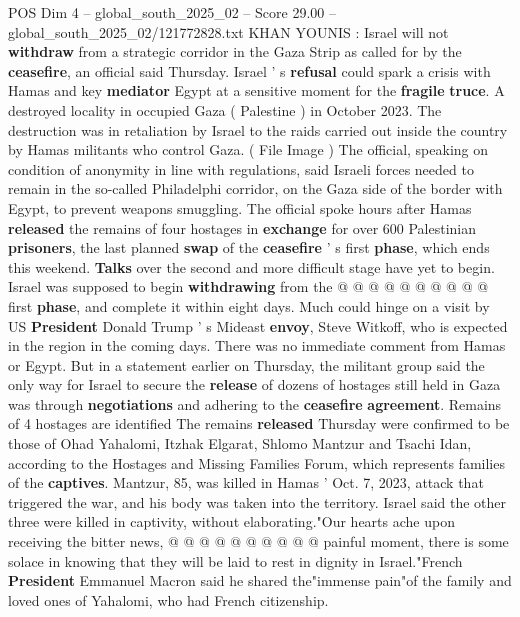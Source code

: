 \begin{textsample}{POS Dim 4 – global\_south\_2025\_02 – Score 29.00 – global\_south\_2025\_02/121772828.txt}  \label{ex:f4_pos_025}
KHAN YOUNIS : Israel will not \textbf{withdraw} from a strategic corridor in the Gaza Strip as called for by the \textbf{ceasefire}, an official said Thursday.
Israel ' s \textbf{refusal} could spark a crisis with Hamas and key \textbf{mediator} Egypt at a sensitive moment for the \textbf{fragile} \textbf{truce}.
A destroyed locality in occupied Gaza ( Palestine ) in October 2023.
The destruction was in retaliation by Israel to the raids carried out inside the country by Hamas militants who control Gaza. ( File Image ) The official, speaking on condition of anonymity in line with regulations, said Israeli forces needed to remain in the so-called Philadelphi corridor, on the Gaza side of the border with Egypt, to prevent weapons smuggling.
The official spoke hours after Hamas \textbf{released} the remains of four hostages in \textbf{exchange} for over 600 Palestinian \textbf{prisoners}, the last planned \textbf{swap} of the \textbf{ceasefire} ' s first \textbf{phase}, which ends this weekend. \textbf{Talks} over the second and more difficult stage have yet to begin.
Israel was supposed to begin \textbf{withdrawing} from the @ @ @ @ @ @ @ @ @ @ first \textbf{phase}, and complete it within eight days.
Much could hinge on a visit by US \textbf{President} Donald Trump ' s Mideast \textbf{envoy}, Steve Witkoff, who is expected in the region in the coming days.
There was no immediate comment from Hamas or Egypt.
But in a statement earlier on Thursday, the militant group said the only way for Israel to secure the \textbf{release} of dozens of hostages still held in Gaza was through \textbf{negotiations} and adhering to the \textbf{ceasefire} \textbf{agreement}.
Remains of 4 hostages are identified The remains \textbf{released} Thursday were confirmed to be those of Ohad Yahalomi, Itzhak Elgarat, Shlomo Mantzur and Tsachi Idan, according to the Hostages and Missing Families Forum, which represents families of the \textbf{captives}.
Mantzur, 85, was killed in Hamas ' Oct. 7, 2023, attack that triggered the war, and his body was taken into the territory.
Israel said the other three were killed in captivity, without elaborating."Our hearts ache upon receiving the bitter news, @ @ @ @ @ @ @ @ @ @ painful moment, there is some solace in knowing that they will be laid to rest in dignity in Israel."French \textbf{President} Emmanuel Macron said he shared the"immense pain"of the family and loved ones of Yahalomi, who had French citizenship.

\end{textsample}
